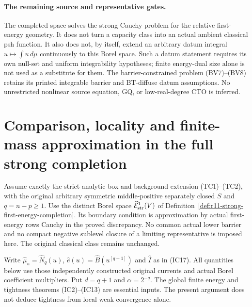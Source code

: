 \documentclass[11pt,a4paper]{article}
\numberwithin{equation}{section}
\theoremstyle{definition}
\theoremstyle{remark}
\begin{document}
\paragraph{The remaining source and representative gates.}
The completed space solves the strong Cauchy problem for the
relative first-energy geometry. It does not turn a capacity
class into an actual ambient classical psh function. It also
does not, by itself, extend an arbitrary datum integral
$u\mapsto\int u\,d\mu$ continuously to this Borel space.
Such a datum statement requires its own null-set and uniform
integrability hypotheses; finite energy-dual size alone is
not used as a substitute for them. The barrier-constrained
problem (BV7)--(BV8) retains its printed integrable barrier
and BT-diffuse datum assumptions. No unrestricted nonlinear
source equation, GQ, or low-real-degree CTO is inferred.



\section{Comparison, locality and finite-mass approximation in the full strong completion}
\label{sec:r11-strong-completed-comparison}

Assume exactly the strict analytic box and background extension
(TC1)--(TC2), with the original arbitrary symmetric middle-positive
separately closed $S$ and $q=n-p\geq1$.
Use the distinct Borel space
$\widehat{\mathcal E}^1_{\rm str}(V)$ of
Definition~\ref{def:r11-strong-first-energy-completion}.
Its boundary condition is approximation by actual first-energy
rows Cauchy in the proved discrepancy. No common actual lower
barrier and no compact negative sublevel closure of a limiting
representative is imposed here. The original classical class
remains unchanged.

Write $\widehat\mu_u=\widehat N_q(u)$,
$\widehat e(u)=\widehat B(u^{[q+1]})$ and
$\widehat I$ as in (IC17). All quantities below use those
independently constructed original currents and actual Borel
coefficient multipliers. Put $d=q+1$ and $\alpha=2^{-q}$.
The global finite energy and tightness theorems (IC2)--(IC13)
are essential inputs. The present argument does not deduce
tightness from local weak convergence alone.
\end{document}
